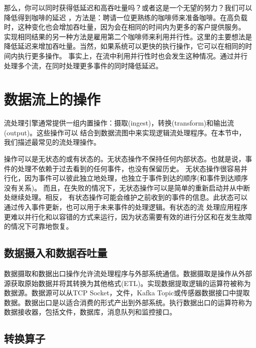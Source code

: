 \documentclass[cn,11pt,chinese]{elegantbook}
\begin{document}
那么，你可以同时获得低延迟和高吞吐量吗？或者这是一个无望的努力？我们可以降低得到咖啡的延迟
，方法是：聘请一位更熟练的咖啡师来准备咖啡。在高负载时，这种变化也会增加吞吐量，因为会在相同的时间内为更多的客户提供服务。
实现相同结果的另一种方法是雇用第二个咖啡师来利用并行性。这里的主要想法是降低延迟来增加吞吐量。当然，如果系统可以更快的执行操作，它可以在相同的时间内执行更多操作。
事实上，在流中利用并行性时也会发生这种情况。通过并行处理多个流，在同时处理更多事件的同时降低延迟。

\hypertarget{ux6570ux636eux6d41ux4e0aux7684ux64cdux4f5c}{%
\section{数据流上的操作}\label{ux6570ux636eux6d41ux4e0aux7684ux64cdux4f5c}}

流处理引擎通常提供一组内置操作：摄取(ingest)，转换(transform)和输出流(output)。这些操作可以
结合到数据流图中来实现逻辑流处理程序。在本节中，我们描述最常见的流处理操作。

操作可以是无状态的或有状态的。无状态操作不保持任何内部状态。也就是说，事件的处理不依赖于过去看到的任何事件，也没有保留历史。
无状态操作很容易并行化，因为事件可以彼此独立地处理，也独立于事件到达的顺序(和事件到达顺序没有关系)。
而且，在失败的情况下，无状态操作可以是简单的重新启动并从中断处继续处理。相反，
有状态操作可能会维护之前收到的事件的信息。此状态可以通过传入事件更新，也可以用于未来事件的处理逻辑。有状态的流
处理应用程序更难以并行化和以容错的方式来运行，因为状态需要有效的进行分区和在发生故障的情况下可靠地恢复。

\hypertarget{ux6570ux636eux6444ux5165ux548cux6570ux636eux541eux5410ux91cf}{%
\subsection{数据摄入和数据吞吐量}\label{ux6570ux636eux6444ux5165ux548cux6570ux636eux541eux5410ux91cf}}

数据摄取和数据出口操作允许流处理程序与外部系统通信。数据摄取是操作从外部源获取原始数据并将其转换为其他格式(ETL)。实现数据提取逻辑的运算符被称为数据源。数据源可以从TCP
Socket，文件，Kafka
Topic或传感器数据接口中提取数据。数据出口是以适合消费的形式产出到外部系统。执行数据出口的运算符称为数据接收器，包括文件，数据库，消息队列和监控接口。

\hypertarget{ux8f6cux6362ux7b97ux5b50}{%
\subsection{转换算子}\label{ux8f6cux6362ux7b97ux5b50}}
\end{document}
